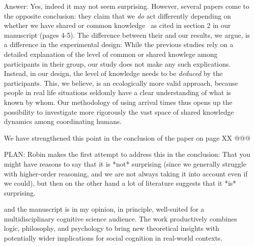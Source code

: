 \documentclass[a4paper]{article}
\newenvironment{robin}{\smallskip \noindent \color{red!10!green!50!blue}}{\color{black}\smallskip}
\begin{document}
\begin{robin}
Answer: Yes, indeed it may not seem surprising. However, several papers come to the opposite conclusion: they claim that we \emph{do} act differently depending on whether we have shared or common knowledge~\cite{rubinstein1989electronic, lee2010rationales, thomas2014psychology, thomas2016recursive, thomas2018common, de2019common, de2019maimonides} as cited in section 2 in our manuscript (pages 4-5). The difference between their and our results, we argue, is a difference in the experimental design: While the previous studies rely on a detailed explanation of the level of common or shared knowlege among participants in their group, our study does not make any such explications. Instead, in our design, the level of knowledge needs to be \emph{deduced} by the participants. This, we believe, is an ecologically more valid approach, because people in real life situations seldomly have a clear understanding of what is known by whom. Our methodology of using arrival times thus opens up the possibility to investigate more rigorously the vast space of shared knowledge dynamics among coordinating humans. 

We have strengthened this point in the conclusion of the paper on page XX @@@

PLAN: Robin makes the first attempt to address this in the conclusion: That you might have reasons to say that it is *not* surprising (since we generally struggle with higher-order reasoning, and we are not always taking it into account even if we could), but then on the other hand a lot of literature suggests that it *is* surprising. 
\end{robin} 

 
  and the manuscript is in my opinion, in principle, well-suited for a multidisciplinary cognitive science audience. The work productively combines logic, philosophy, and psychology to bring new theoretical insights with potentially wider implications for social cognition in real-world contexts.
\end{document}
